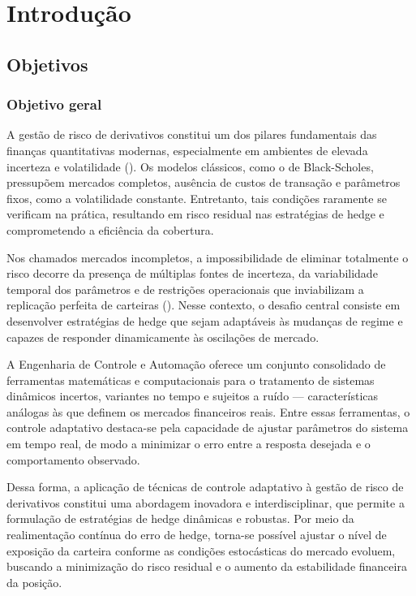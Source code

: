%
%

\chapter{Introdução}\label{chap:introducao}
\section{Objetivos}
\subsection{Objetivo geral}
A gestão de risco de derivativos constitui um dos pilares fundamentais das finanças quantitativas modernas, especialmente em ambientes de elevada incerteza e volatilidade (\textcite{cogley2008}). Os modelos clássicos, como o de Black-Scholes, pressupõem mercados completos, ausência de custos de transação e parâmetros fixos, como a volatilidade constante. Entretanto, tais condições raramente se verificam na prática, resultando em risco residual nas estratégias de hedge e comprometendo a eficiência da cobertura.

Nos chamados mercados incompletos, a impossibilidade de eliminar totalmente o risco decorre da presença de múltiplas fontes de incerteza, da variabilidade temporal dos parâmetros e de restrições operacionais que inviabilizam a replicação perfeita de carteiras (\textcite{fontanaStochasticControlPerspective2023}). Nesse contexto, o desafio central consiste em desenvolver estratégias de hedge que sejam adaptáveis às mudanças de regime e capazes de responder dinamicamente às oscilações de mercado.

A Engenharia de Controle e Automação oferece um conjunto consolidado de ferramentas matemáticas e computacionais para o tratamento de sistemas dinâmicos incertos, variantes no tempo e sujeitos a ruído — características análogas às que definem os mercados financeiros reais. Entre essas ferramentas, o controle adaptativo destaca-se pela capacidade de ajustar parâmetros do sistema em tempo real, de modo a minimizar o erro entre a resposta desejada e o comportamento observado.

Dessa forma, a aplicação de técnicas de controle adaptativo à gestão de risco de derivativos constitui uma abordagem inovadora e interdisciplinar, que permite a formulação de estratégias de hedge dinâmicas e robustas. Por meio da realimentação contínua do erro de hedge, torna-se possível ajustar o nível de exposição da carteira conforme as condições estocásticas do mercado evoluem, buscando a minimização do risco residual e o aumento da estabilidade financeira da posição.

